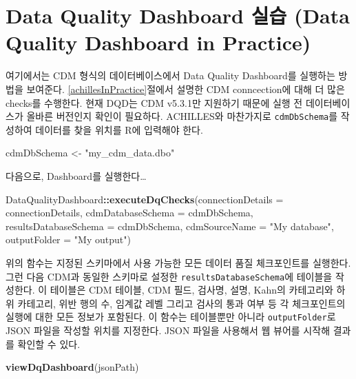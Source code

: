 \documentclass[10.5pt]{book}
\newenvironment{Shaded}{\begin{snugshade}}{\end{snugshade}}
\newcommand{\KeywordTok}[1]{\textcolor[rgb]{0.13,0.29,0.53}{\textbf{#1}}}
\newcommand{\DataTypeTok}[1]{\textcolor[rgb]{0.13,0.29,0.53}{#1}}
\newcommand{\StringTok}[1]{\textcolor[rgb]{0.31,0.60,0.02}{#1}}
\newcommand{\OperatorTok}[1]{\textcolor[rgb]{0.81,0.36,0.00}{\textbf{#1}}}
\newcommand{\NormalTok}[1]{#1}
\theoremstyle{definition}
\theoremstyle{definition}
\theoremstyle{definition}
\theoremstyle{remark}
\begin{document}
\section{Data Quality Dashboard 실습 (Data Quality Dashboard in
Practice)}\label{dqdInPractice}

여기에서는 CDM 형식의 데이터베이스에서 Data Quality Dashboard를 실행하는
방법을 보여준다. \ref{achillesInPractice}절에서 설명한 CDM conncection에
대해 더 많은 checks를 수행한다. 현재 DQD는 CDM v5.3.1만 지원하기 때문에
실행 전 데이터베이스가 올바른 버전인지 확인이 필요하다. ACHILLES와
마찬가지로 \texttt{cdmDbSchema}를 작성하여 데이터를 찾을 위치를 R에
입력해야 한다.

\begin{Shaded}
\begin{Highlighting}[]
\NormalTok{cdmDbSchema <-}\StringTok{ "my_cdm_data.dbo"}
\end{Highlighting}
\end{Shaded}

다음으로, Dashboard를 실행한다\ldots{}

\begin{Shaded}
\begin{Highlighting}[]
\NormalTok{DataQualityDashboard}\OperatorTok{::}\KeywordTok{executeDqChecks}\NormalTok{(}\DataTypeTok{connectionDetails =}\NormalTok{ connectionDetails, }
                                      \DataTypeTok{cdmDatabaseSchema =}\NormalTok{ cdmDbSchema, }
                                      \DataTypeTok{resultsDatabaseSchema =}\NormalTok{ cdmDbSchema,}
                                      \DataTypeTok{cdmSourceName =} \StringTok{"My database"}\NormalTok{,}
                                      \DataTypeTok{outputFolder =} \StringTok{"My output"}\NormalTok{)}
\end{Highlighting}
\end{Shaded}

위의 함수는 지정된 스키마에서 사용 가능한 모든 데이터 품질 체크포인트를
실행한다. 그런 다음 CDM과 동일한 스키마로 설정한
\texttt{resultsDatabaseSchema}에 테이블을 작성한다. 이 테이블은 CDM
테이블, CDM 필드, 검사명, 설명, Kahn의 카테고리와 하위 카테고리, 위반
행의 수, 임계값 레벨 그리고 검사의 통과 여부 등 각 체크포인트의 실행에
대한 모든 정보가 포함된다. 이 함수는 테이블뿐만 아니라
\texttt{outputFolder}로 JSON 파일을 작성할 위치를 지정한다. JSON 파일을
사용해서 웹 뷰어를 시작해 결과를 확인할 수 있다.

\begin{Shaded}
\begin{Highlighting}[]
\KeywordTok{viewDqDashboard}\NormalTok{(jsonPath)}
\end{Highlighting}
\end{Shaded}
\end{document}
